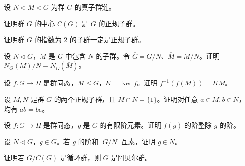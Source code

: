 \newpage
\noindent\begin{minipage}{\textwidth}
设 $N<M<G$ 为群 $G$ 的真子群链。
\end{minipage}\par\vfill
\noindent\begin{minipage}{\textwidth}
证明群 $G$ 的中心 $C(G)$ 是 $G$ 的正规子群。
\end{minipage}\par\vfill
\noindent\begin{minipage}{\textwidth}
证明群 $G$ 的指数为 $2$ 的子群一定是正规子群。
\end{minipage}\par\vfill
\newpage
\noindent\begin{minipage}{\textwidth}
设 $N\triangleleft G$，$M$ 是 $G$ 中包含 $N$ 的子群。令 $\overline G=G/N$、$\overline M=M/N$。证明 $N_G(M)/N=N_{\overline G}(\overline M)$。
\end{minipage}\par\vfill
\noindent\begin{minipage}{\textwidth}
设 $f:G\to H$ 是群同态，$M\le G$，$K=\ker f$。证明 $f^{-1}(f(M))=KM$。
\end{minipage}\par\vfill
\noindent\begin{minipage}{\textwidth}
设 $M,N$ 是群 $G$ 的两个正规子群，且 $M\cap N=\{1\}$。证明对任意 $a\in M,b\in N$，均有 $ab=ba$。
\end{minipage}\par\vfill
\newpage
\noindent\begin{minipage}{\textwidth}
设 $f:G\to H$ 是群同态，$g$ 是 $G$ 的有限阶元素。证明 $f(g)$ 的阶整除 $g$ 的阶。
\end{minipage}\par\vfill
\noindent\begin{minipage}{\textwidth}
设 $N\triangleleft G$，$g\in G$。若 $g$ 的阶和 $|G/N|$ 互素，证明 $g\in N$。
\end{minipage}\par\vfill
\noindent\begin{minipage}{\textwidth}
证明若 $G/C(G)$ 是循环群，则 $G$ 是阿贝尔群。
\end{minipage}\par\vfill
